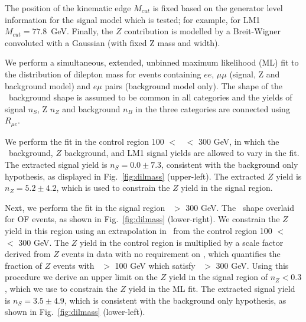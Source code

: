 The position of the kinematic edge $M_{cut}$ is fixed based on the generator level
information for the signal model which is tested; for example, for LM1 
$M_{cut} = 77.8$~GeV. Finally, the $Z$ contribution is modelled by a Breit-Wigner 
convoluted with a Gaussian (with fixed Z mass and width). 

We perform a simultaneous, extended, unbinned maximum 
likelihood (ML) fit to the distribution of dilepton mass for events containing $ee$, $\mu\mu$ 
(signal, Z and background model)
and $e\mu$ pairs (background model only). 
The shape of the \ttbar\ background shape is assumed to be common in all categories
and the yields of signal $n_S$, Z $n_Z$ and background $n_B$ 
in the three categories are connected using $R_{\mu e}$. 

We perform the fit in the control region 100 $<$ \Ht\ $<$ 300 GeV, in
which the \ttbar\ background, $Z$ background, and LM1 signal yields are allowed to vary in the fit. 
The extracted signal yield is $n_S = 0.0 \pm 7.3$, consistent with the background only 
hypothesis, as displayed in Fig.~\ref{fig:dilmass} (upper-left). 
The extracted $Z$ yield is $n_Z = 5.2 \pm 4.2$, which is 
used to constrain the $Z$ yield in the signal region. 

Next, we perform the fit in the signal region \Ht\ $>$ 300 GeV. The \ttbar\ shape
overlaid for OF events, as shown in Fig.~\ref{fig:dilmass} (lower-right). We
constrain the $Z$ yield in this region using an extrapolation in \Ht\ from the 
control region 100 $<$ \Ht\ $<$ 300 GeV. The $Z$ yield in the control region is
multiplied by a scale factor derived from $Z$ events in data with no requirement
on \MET, which quantifies the fraction of $Z$ events with \Ht\ $>$ 100 GeV which 
satisfy \Ht\ $>$ 300 GeV. Using this procedure we derive an upper limit on the
$Z$ yield in the signal region of $n_Z < 0.3$, which we use to constrain the
$Z$ yield in the ML fit. The extracted signal yield is $n_S = 3.5 \pm 4.9$,
which is consistent with the background only hypothesis,
as shown in Fig.~\ref{fig:dilmass} (lower-left). 
